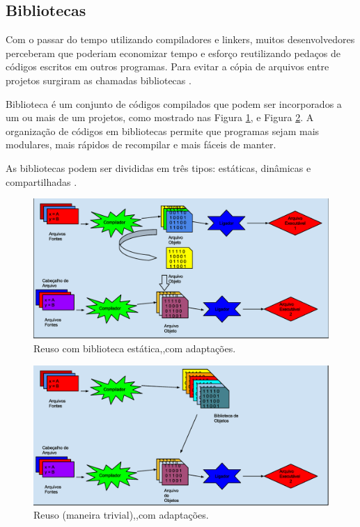 \subsection{Bibliotecas}

Com o passar do tempo utilizando compiladores e linkers, muitos 
desenvolvedores perceberam que poderiam economizar tempo e esforço 
reutilizando pedaços de códigos escritos em outros programas. Para evitar a
 cópia de arquivos entre projetos surgiram as chamadas bibliotecas \cite[pag. 227]{ref36}.

Biblioteca é um conjunto de códigos compilados que podem ser incorporados a
 um ou mais de um projetos, como mostrado nas Figura \ref{fig04}, e Figura
 \ref{fig05}. A organização de códigos em bibliotecas permite que 
programas sejam mais modulares, mais rápidos de recompilar e mais 
fáceis de manter\cite{Lasca}.

As bibliotecas podem ser divididas em três tipos: estáticas, 
dinâmicas e compartilhadas \cite{Lasca}.

\begin{figure}[h]
    \centering
        \includegraphics[keepaspectratio=true,scale=0.38]{figuras/reuso_lib_estatica.eps}
    \caption{ Reuso com biblioteca estática,\cite[pag. 54]{ref39},com adaptações.}
    \label{fig04}
\end{figure}

\begin{figure}[h]
    \centering
        \includegraphics[keepaspectratio=true,scale=0.38]{figuras/reuso_lib_estatica2.eps}
    \caption{Reuso (maneira trivial),\cite[pag. 54]{ref39},com adaptações.}
    \label{fig05}
\end{figure}


